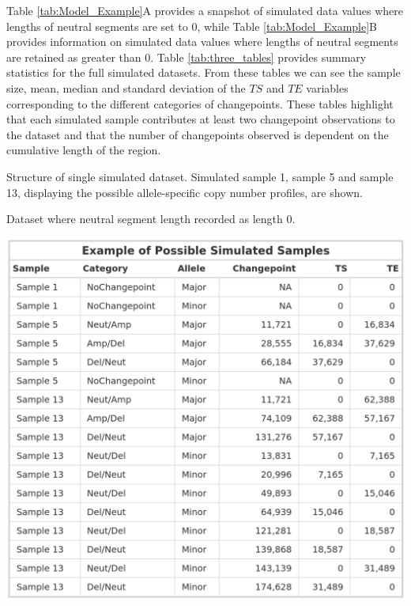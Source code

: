 Table \ref{tab:Model_Example}A provides a snapshot of simulated data values where lengths of neutral segments are set to 0, while Table \ref{tab:Model_Example}B provides information on simulated data values where lengths of neutral segments are retained as greater than 0. Table \ref{tab:three_tables} provides summary statistics for the full simulated datasets. From these tables we can see the sample size, mean, median and standard deviation of the $TS$ and $TE$ variables corresponding to the different categories of changepoints. These tables highlight that each simulated sample contributes at least two changepoint observations to the dataset and that the number of changepoints observed is dependent on the cumulative length of the region. 

\vfill 
\begin{table}[!h]
    \caption[Structure of single simulated dataset.]{Structure of single simulated dataset. Simulated sample 1, sample 5 and sample 13, displaying the possible allele-specific copy number profiles, are shown.}
    \label{tbl:scen3_structure}
     \begin{subtable}[t]{.49\textwidth}
      \caption{Dataset where neutral segment length recorded as length 0.}
      \centering
      \includegraphics[width = 1\textwidth]{../tables/Chapter_5/Indv_Simulated_Example_NoNeut.png}
    \end{subtable}%
    \hspace{0.5cm}
     \begin{subtable}[t]{.49\textwidth}

\end{subtable}
\end{table}
